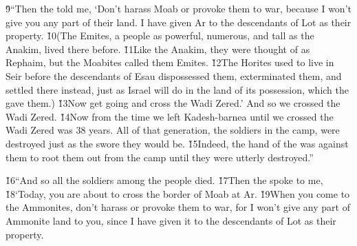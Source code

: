 \v{9}``Then the  told me, `Don't harass Moab or provoke them to war, because I won't give you any part of their land. I have given Ar to the descendants of Lot as their property. \v{10}(The Emites, a people as powerful, numerous, and tall as the Anakim, lived there before. \v{11}Like the Anakim, they were thought of as Rephaim, but the Moabites called them Emites. \v{12}The Horites used to live in Seir before the descendants of Esau dispossessed them, exterminated them, and settled there instead, just as Israel will do in the land of its possession, which the  gave them.) \v{13}Now get going and cross the Wadi Zered.' And so we crossed the Wadi Zered. \v{14}Now from the time we left Kadesh-barnea until we crossed the Wadi Zered was 38 years. All of that generation, the soldiers in the camp, were destroyed just as the  swore they would be. \v{15}Indeed, the hand of the  was against them to root them out from the camp until they were utterly destroyed.''

\v{16}``And so all the soldiers among the people died. \v{17}Then the  spoke to me, \v{18}`Today, you are about to cross the border of Moab at Ar. \v{19}When you come to the Ammonites, don't harass or provoke them to war, for I won't give any part of Ammonite land to you, since I have given it to the descendants of Lot as their property.

